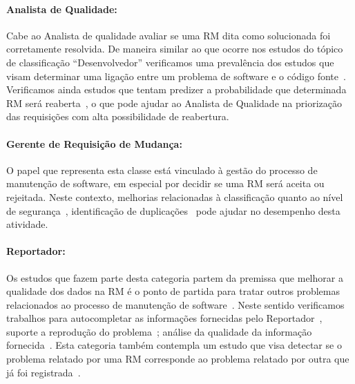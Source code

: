 \paragraph{Analista de Qualidade:} Cabe ao Analista de qualidade avaliar se uma
RM dita como solucionada foi corretamente resolvida. De maneira similar ao que
ocorre nos estudos do tópico de classificação ``Desenvolvedor'' verificamos uma
prevalência dos estudos que visam determinar uma ligação entre um problema de
software e o código
fonte~\cite{corley2011recovering,Wong:2014:BBF:2705615.2706096,
	Thung:2014:BIT:2635868.2661678,Nguyen:2012:MAR:2393596.2393671,thung2013automatic,
	Romo:2015:TAT:2745802.2745833}. Verificamos ainda estudos que tentam
predizer a probabilidade que determinada RM será
reaberta~\cite{xia2015automatic}, o que pode ajudar ao Analista de Qualidade na
priorização das requisições com alta possibilidade de reabertura.

\paragraph{Gerente de Requisição de	Mudança:} O papel que representa esta classe
está vinculado à gestão do processo de manutenção de software, em especial por
decidir se uma RM será aceita ou rejeitada. Neste contexto, melhorias
relacionadas à classificação quanto ao nível de
segurança~\cite{gegick2010identifying, zhang2011bug,
	ValdiviaGarcia:2014:CPB:2597073.2597099}, identificação de
duplicações~\cite{hindle2016contextual, sun2010discriminative,
	alipour2013contextual, banerjee2012automated} pode ajudar no desempenho
desta atividade.

\paragraph{Reportador:} Os estudos que fazem parte desta categoria  partem da
premissa que melhorar a qualidade dos dados na RM é o ponto de partida para
tratar outros problemas relacionados ao processo de manutenção de
software~\cite{moran2015auto, Moran:2015:EAA:2786805.2807557, Bettenburg2008a}.
Neste sentido verificamos trabalhos para autocompletar as informações fornecidas
pelo Reportador~\cite{moran2015auto}, suporte a reprodução do
problema~\cite{Moran:2015:EAA:2786805.2807557}; análise da qualidade da
informação fornecida~\cite{Bettenburg2008a, Tu:2014:MQI:2677832.2677844}. Esta
categoria também contempla um estudo que visa detectar se o problema relatado
por uma RM corresponde ao problema relatado por outra que já foi
registrada~\cite{Thung2014}.

